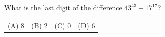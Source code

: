 What is the last digit of the difference $43^{43}-17^{17}$?



\begin{tabular}{llll}
(A) $8$ & (B) $2$ & (C) $0$ & (D) $6$
\end{tabular}
